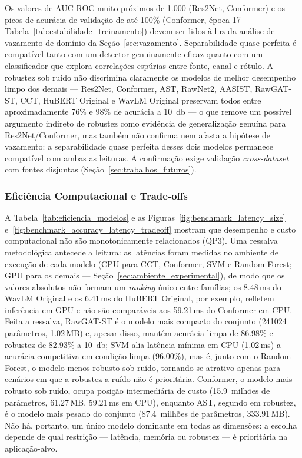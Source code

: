 \documentclass[12pt,a4paper]{article}
\begin{document}
Os valores de AUC-ROC muito próximos de \num{1,000} (Res2Net, Conformer) e os
picos de acurácia de validação de até \num{100}\% (Conformer, época 17 ---
Tabela~\ref{tab:estabilidade_treinamento}) devem ser lidos à luz da análise de
vazamento de domínio da Seção~\ref{sec:vazamento}. Separabilidade quase perfeita
é compatível tanto com um detector genuinamente eficaz quanto com um
classificador que explora correlações espúrias entre fonte, canal e rótulo. A
robustez sob ruído não discrimina claramente os modelos de melhor desempenho
limpo dos demais --- Res2Net,
Conformer, AST, RawNet2, AASIST, RawGAT-ST, CCT, HuBERT Original e WavLM
Original preservam todos entre aproximadamente \num{76}\% e \num{98}\% de
acurácia a \SI{10}{\decibel} --- o que remove um possível argumento indireto de robustez
como evidência de generalização genuína para Res2Net/Conformer, mas também não
confirma nem afasta a hipótese de vazamento: a separabilidade quase perfeita
desses dois modelos permanece compatível com ambas as leituras. A confirmação
exige validação \textit{cross-dataset} com fontes disjuntas
(Seção~\ref{sec:trabalhos_futuros}).

\subsubsection*{Eficiência Computacional e Trade-offs}

A Tabela~\ref{tab:eficiencia_modelos} e as
Figuras~\ref{fig:benchmark_latency_size}
e~\ref{fig:benchmark_accuracy_latency_tradeoff} mostram que desempenho e custo
computacional não são monotonicamente relacionados (QP3). Uma ressalva
metodológica antecede a leitura: as latências foram medidas no ambiente de
execução de cada modelo (CPU para CCT, Conformer, SVM e Random Forest; GPU
para os demais --- Seção~\ref{sec:ambiente_experimental}), de modo que os
valores absolutos não formam um \textit{ranking} único entre famílias; os
\num{8,48}\,ms do WavLM Original e os \num{6,41}\,ms do HuBERT Original, por
exemplo, refletem inferência em GPU e não são comparáveis aos \num{59,21}\,ms
do Conformer em CPU. Feita a ressalva, RawGAT-ST é o modelo mais compacto do
conjunto (\num{241024} parâmetros, \num{1,02}\,MB) e, apesar disso, mantém
acurácia limpa de \num{86,98}\% e robustez de \num{82,93}\% a
\SI{10}{\decibel}; SVM alia latência mínima em CPU (\num{1,02}\,ms) a acurácia
competitiva em condição limpa (\num{96,00}\%), mas é, junto com o Random
Forest, o modelo menos robusto sob ruído, tornando-se atrativo apenas para
cenários em que a robustez a ruído não é prioritária. Conformer, o modelo mais
robusto sob ruído, ocupa posição intermediária de custo (\num{15,9}~milhões de
parâmetros, \num{61,27}\,MB, \num{59,21}\,ms em CPU), enquanto AST, segundo em
robustez, é o modelo mais pesado do conjunto (\num{87,4}~milhões de
parâmetros, \num{333,91}\,MB). Não há, portanto, um único modelo dominante em
todas as dimensões: a escolha depende de qual restrição --- latência, memória
ou robustez --- é prioritária na aplicação-alvo.
\end{document}
